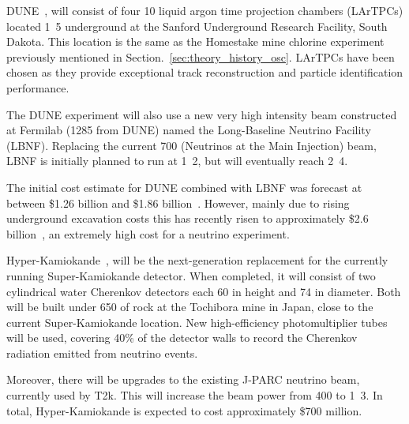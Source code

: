 DUNE~\cite{acciarri2016, abi2020}, will consist of four \unit{10}{} liquid argon time
projection chambers (LArTPCs) located \unit{1.5}{} underground at the Sanford
Underground Research Facility, South Dakota. This location is the same as the Homestake mine
chlorine experiment previously mentioned in Section.~\ref{sec:theory_history_osc}. LArTPCs have
been chosen as they provide exceptional track reconstruction and particle identification
performance.

The DUNE experiment will also use a new very high intensity beam constructed at Fermilab
(\unit{1285}{} from DUNE) named the Long-Baseline Neutrino Facility (LBNF). Replacing
the current \unit{700}{} \numi (Neutrinos at the Main Injection) beam, LBNF is
initially planned to run at \unit{1.2}{}, but will eventually reach
\unit{2.4}{}.

The initial cost estimate for DUNE combined with LBNF was forecast at between \$1.26 billion and
\$1.86 billion~\cite{dune_cost}. However, mainly due to rising underground excavation costs this
has recently risen to approximately \$2.6 billion~\cite{aip_budget}, an extremely high cost for a
neutrino experiment.

Hyper-Kamiokande~\cite{hyper_dr, hyperkamiok2014}, will be the next-generation replacement for the
currently running Super-Kamiokande detector. When completed, it will consist of two cylindrical
water Cherenkov detectors each \unit{60}{} in height and \unit{74}{} in
diameter. Both will be built under \unit{650}{}  of rock at the Tochibora mine in Japan,
close to the current Super-Kamiokande location. New high-efficiency photomultiplier tubes will be
used, covering 40\% of the detector walls to record the Cherenkov radiation emitted from neutrino
events.

Moreover, there will be upgrades to the existing J-PARC neutrino beam, currently used by T2k. This
will increase the beam power from \unit{400}{} to \unit{1.3}{}. In total,
Hyper-Kamiokande is expected to cost approximately \$700 million.